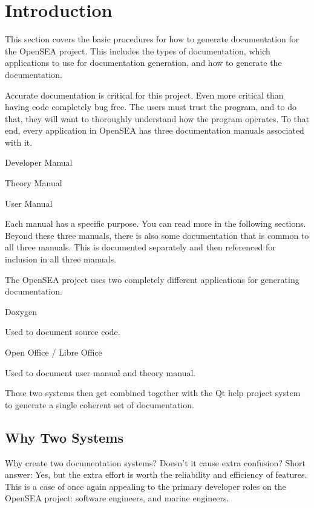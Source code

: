 \hypertarget{documentation_documentation_intro}{}\section{Introduction}\label{documentation_documentation_intro}
This section covers the basic procedures for how to generate documentation for the Open\-S\-E\-A project. This includes the types of documentation, which applications to use for documentation generation, and how to generate the documentation.

Accurate documentation is critical for this project. Even more critical than having code completely bug free. The users must trust the program, and to do that, they will want to thoroughly understand how the program operates. To that end, every application in Open\-S\-E\-A has three documentation manuals associated with it.
\begin{DoxyEnumerate}
\item Developer Manual
\item Theory Manual
\item User Manual
\end{DoxyEnumerate}

Each manual has a specific purpose. You can read more in the following sections. Beyond these three manuals, there is also some documentation that is common to all three manuals. This is documented separately and then referenced for inclusion in all three manuals.

The Open\-S\-E\-A project uses two completely different applications for generating documentation.
\begin{DoxyEnumerate}
\item Doxygen
\begin{DoxyItemize}
\item Used to document source code.
\end{DoxyItemize}
\item Open Office / Libre Office
\begin{DoxyItemize}
\item Used to document user manual and theory manual.
\end{DoxyItemize}
\end{DoxyEnumerate}

These two systems then get combined together with the Qt help project system to generate a single coherent set of documentation.\hypertarget{documentation_documentation_twosyst}{}\subsection{Why Two Systems}\label{documentation_documentation_twosyst}
Why create two documentation systems? Doesn't it cause extra confusion? Short answer\-: Yes, but the extra effort is worth the reliability and efficiency of features. This is a case of once again appealing to the primary developer roles on the Open\-S\-E\-A project\-: software engineers, and marine engineers.

